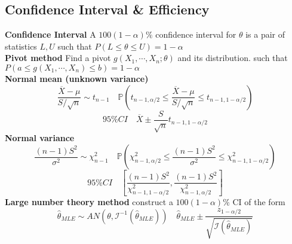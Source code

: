 \documentclass[8pt]{article}
\begin{document}
\begin{multicols}{3}
{   \subsection*{Confidence Interval \& Efficiency}
   \textbf{Confidence Interval} A $100(1-\alpha)\%$ confidence interval for $\theta$ is a pair of statistics $L, U$ such that $P(L \leq \theta \leq U) = 1 - \alpha$\\
   \textbf{Pivot method} Find a pivot $g(X_1, \cdots, X_n; \theta)$ and its distribution. such that $P(a\leq g(X_1, \cdots, X_n)\leq b) = 1-\alpha$\\
   \textbf{Normal mean (unknown variance)}
   \[
      \frac{\overline{X} -\mu}{S / \sqrt{n}} \sim t_{n-1} \quad \mathbb{P}\left( t_{n-1, \alpha/2} \leq \frac{\overline{X} -\mu}{S / \sqrt{n}} \leq t_{n-1, 1-\alpha/2} \right)
   \]
   \[
    95\%CI \quad \overline{X}\pm \frac{S}{\sqrt{n}}t_{n-1,1-\alpha/2}
   \]
   \textbf{Normal variance}
   \[
    \frac{(n-1)S^2}{\sigma^2} \sim \chi^2_{n-1} \quad \mathbb{P}\left( \chi^2_{n-1,\alpha/2}\leq  \frac{(n-1)S^2}{\sigma^2} \leq \chi^2_{n-1, 1-\alpha/2} \right)
   \]
   \[
    95\% CI \quad \left[ \frac{(n-1)S^2}{\chi^2_{n-1,1-\alpha/2}}, \frac{(n-1)S^2}{\chi^2_{n-1,\alpha/2}} \right]
   \]
   \textbf{Large number theory method} construct a $100(1-\alpha)\%$ CI of the form
   \[
    \hat{\theta}_{MLE} \sim AN(\theta, \mathcal{I}^{-1}(\hat{\theta}_{MLE}))  \quad \hat{\theta}_{MLE} \pm \frac{z_{1-\alpha/2 }}{\sqrt{\mathcal{I}(\hat{\theta}_{MLE})}}
   \]
}
\end{multicols}
\end{document}

